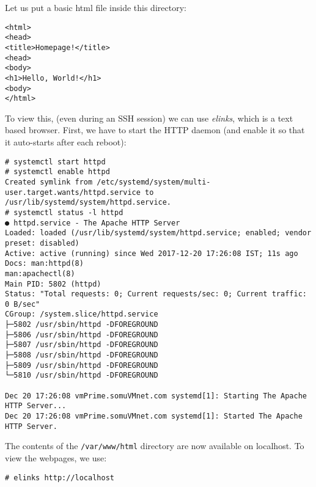 Let us put a basic html file inside this directory:

\vspace{-15pt}
\begin{verbatim}
<html>
<head>
<title>Homepage!</title>
<head>
<body>
<h1>Hello, World!</h1>
<body>
</html>
\end{verbatim}
\vspace{-10pt}

\noindent
To view this, (even during an SSH session) we can use \textit{elinks}, which is a text based browser. First, we have to start the HTTP daemon (and enable it so that it auto-starts after each reboot):

\vspace{-15pt}
\begin{verbatim}
# systemctl start httpd
# systemctl enable httpd
Created symlink from /etc/systemd/system/multi-user.target.wants/httpd.service to /usr/lib/systemd/system/httpd.service.
# systemctl status -l httpd
● httpd.service - The Apache HTTP Server
Loaded: loaded (/usr/lib/systemd/system/httpd.service; enabled; vendor preset: disabled)
Active: active (running) since Wed 2017-12-20 17:26:08 IST; 11s ago
Docs: man:httpd(8)
man:apachectl(8)
Main PID: 5802 (httpd)
Status: "Total requests: 0; Current requests/sec: 0; Current traffic:   0 B/sec"
CGroup: /system.slice/httpd.service
├─5802 /usr/sbin/httpd -DFOREGROUND
├─5806 /usr/sbin/httpd -DFOREGROUND
├─5807 /usr/sbin/httpd -DFOREGROUND
├─5808 /usr/sbin/httpd -DFOREGROUND
├─5809 /usr/sbin/httpd -DFOREGROUND
└─5810 /usr/sbin/httpd -DFOREGROUND

Dec 20 17:26:08 vmPrime.somuVMnet.com systemd[1]: Starting The Apache HTTP Server...
Dec 20 17:26:08 vmPrime.somuVMnet.com systemd[1]: Started The Apache HTTP Server.
\end{verbatim}
\vspace{-10pt}

The contents of the \verb|/var/www/html| directory are now available on localhost. To view the webpages, we use:

\vspace{-15pt}
\begin{verbatim}
# elinks http://localhost
\end{verbatim}
\vspace{-10pt}

